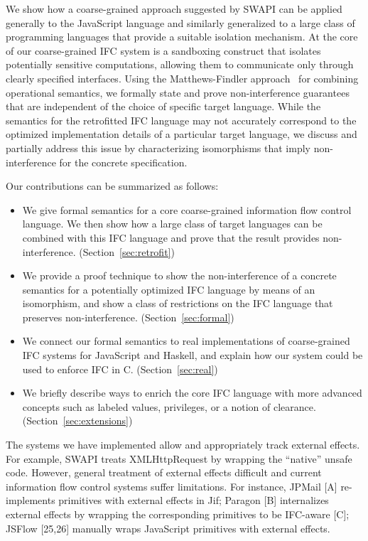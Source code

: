 We show how a coarse-grained approach suggested by
SWAPI can be applied generally to the JavaScript language and 
similarly generalized to a large class of programming languages
that provide a suitable isolation mechanism.
At the core of our coarse-grained IFC system is a sandboxing construct that isolates
potentially sensitive computations, allowing them to
communicate only through clearly specified interfaces.
Using the Matthews-Findler approach~\cite{Matthews:2007:OSM:1190216.1190220}
for combining operational semantics,
we formally state and prove non-interference guarantees that are
independent of the choice of specific target language.
While the semantics for the
retrofitted IFC language may not accurately correspond to the optimized
implementation details of a particular target language, 
we discuss and partially address this issue
by characterizing isomorphisms that imply non-interference for the concrete specification.

Our contributions can be summarized as follows:
\begin{itemize}
  \item We give formal semantics for a core coarse-grained
  information flow control language.
  We then show how a large class of target languages can be combined
  with this IFC language and prove that the result provides
  non-interference. (Section~\ref{sec:retrofit})
  \item We provide a proof technique to show the non-interference
  of a concrete semantics for a potentially optimized IFC language
  by means of an isomorphism, and show a class of restrictions on
  the IFC language that preserves non-interference. (Section~\ref{sec:formal})
  \item We connect our formal semantics to real implementations of
  coarse-grained IFC systems for JavaScript and Haskell, and explain
  how our system could be used to enforce IFC in C. (Section~\ref{sec:real})
  \item We briefly describe ways to enrich the core IFC language with
  more advanced concepts such as labeled values, privileges, or a
  notion of clearance. (Section~\ref{sec:extensions})
\end{itemize}

The systems we have implemented allow and appropriately track
external effects. For example, SWAPI treats XMLHttpRequest by
wrapping the ``native'' unsafe code. 
However, general treatment of external effects difficult and
current information flow control systems suffer limitations.
For instance, JPMail [A] re-implements primitives with external effects in Jif; 
Paragon [B] internalizes external effects by wrapping the corresponding primitives
to be IFC-aware [C]; JSFlow [25,26] manually wraps JavaScript primitives with external effects.  

